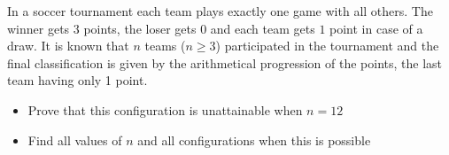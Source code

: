 In a soccer tournament each team plays exactly one game with all others. The winner gets $3$ points, the loser gets $0$ and each team gets $1$ point in case of a draw. It is known that $n$ teams ($n \geq 3$) participated in the tournament and the final classification is given by the arithmetical progression of the points, the last team having only 1 point.
\begin{itemize}
	\item Prove that this configuration is unattainable when $n=12$
	\item Find all values of $n$ and all configurations when this is possible
\end{itemize}
